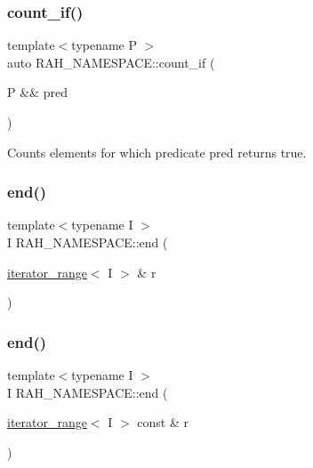 \subsubsection{\texorpdfstring{count\_if()}{count\_if()}\hspace{0.1cm}{\footnotesize\ttfamily [2/2]}}
{\footnotesize\ttfamily template$<$typename P $>$ \\
auto R\+A\+H\+\_\+\+N\+A\+M\+E\+S\+P\+A\+C\+E\+::count\+\_\+if (\begin{DoxyParamCaption}\item[{P \&\&}]{pred }\end{DoxyParamCaption})}



Counts elements for which predicate pred returns true. 


\begin{DoxyCodeInclude}{0}
\end{DoxyCodeInclude}
\mbox{\label{namespace_r_a_h___n_a_m_e_s_p_a_c_e_ad5f90a809a5221569377c400175a20bf}} 
\subsubsection{\texorpdfstring{end()}{end()}\hspace{0.1cm}{\footnotesize\ttfamily [1/2]}}
{\footnotesize\ttfamily template$<$typename I $>$ \\
I R\+A\+H\+\_\+\+N\+A\+M\+E\+S\+P\+A\+C\+E\+::end (\begin{DoxyParamCaption}\item[{\mbox{\hyperlink{struct_r_a_h___n_a_m_e_s_p_a_c_e_1_1iterator__range}{iterator\+\_\+range}}$<$ I $>$ \&}]{r }\end{DoxyParamCaption})}

\mbox{\label{namespace_r_a_h___n_a_m_e_s_p_a_c_e_ac27794282c76c7027fac8b956ffd0a2a}} 
\subsubsection{\texorpdfstring{end()}{end()}\hspace{0.1cm}{\footnotesize\ttfamily [2/2]}}
{\footnotesize\ttfamily template$<$typename I $>$ \\
I R\+A\+H\+\_\+\+N\+A\+M\+E\+S\+P\+A\+C\+E\+::end (\begin{DoxyParamCaption}\item[{\mbox{\hyperlink{struct_r_a_h___n_a_m_e_s_p_a_c_e_1_1iterator__range}{iterator\+\_\+range}}$<$ I $>$ const \&}]{r }\end{DoxyParamCaption})}

